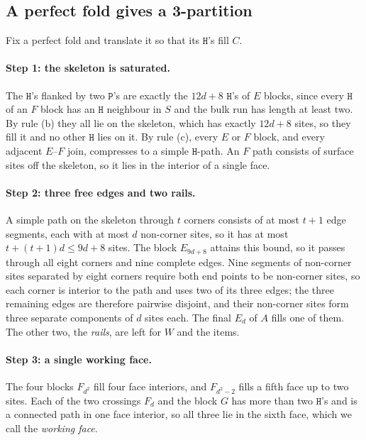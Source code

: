 \documentclass[11pt,letterpaper]{article}
\theoremstyle{definition}
\theoremstyle{remark}
\newcommand{\Hh}{\mathtt{H}}
\newcommand{\Pp}{\mathtt{P}}
\begin{document}
\subsection{A perfect fold gives a 3-partition}

Fix a perfect fold and translate it so that its $\Hh$'s fill $C$.

\paragraph{Step 1: the skeleton is saturated.}
The $\Hh$'s flanked by two $\Pp$'s are exactly the $12d+8$ $\Hh$'s of $E$ blocks, since every $\Hh$ of
an $F$ block has an $\Hh$ neighbour in $S$ and the bulk run has length at least two. By rule (b) they
all lie on the skeleton, which has exactly $12d+8$ sites, so they fill it and no other $\Hh$ lies on
it. By rule (c), every $E$ or $F$ block, and every adjacent $E$--$F$ join, compresses to a simple
$\Hh$-path. An $F$ path consists of surface sites off the skeleton, so it lies in the interior of a
single face.

\paragraph{Step 2: three free edges and two rails.}
A simple path on the skeleton through $t$ corners consists of at most $t+1$ edge segments, each
with at most $d$ non-corner sites, so it has at most $t+(t+1)d\le 9d+8$ sites. The block $E_{9d+8}$
attains this bound, so it passes through all eight corners and nine complete edges. Nine segments of
non-corner sites separated by eight corners require both end points to be non-corner sites, so
each corner is interior to the path and uses two of its three edges; the three
remaining edges are therefore pairwise disjoint, and their non-corner sites form three separate
components of $d$ sites each. The final $E_d$ of $A$ fills one of them. The other two, the
\emph{rails}, are left for $W$ and the items.

\paragraph{Step 3: a single working face.}
The four blocks $F_{d^2}$ fill four face interiors, and $F_{d^2-2}$ fills a fifth face up to two sites.
Each of the two crossings $F_d$ and the block $G$ has more than two $\Hh$'s and is a connected path in
one face interior, so all three lie in the sixth face, which we call the \emph{working face}.
\end{document}
